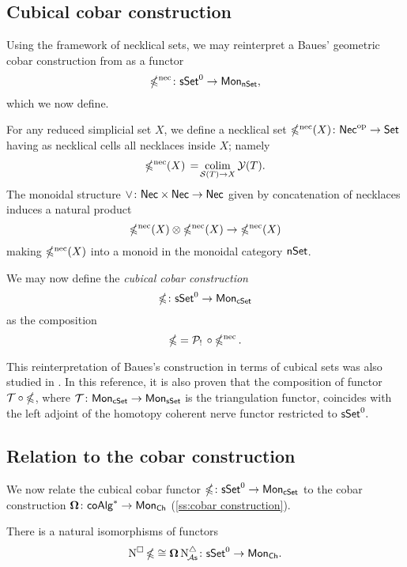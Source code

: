 \subsection{Cubical cobar construction}\label{ss:cubical cobar}

Using the framework of necklical sets, we may reinterpret a Baues' geometric cobar construction from \cite{baues1980geometry} as a functor
\[
\operatorname{\mathbb{\Omega}^{\mathrm{nec}}} \colon \mathsf{sSet}^0 \to \mathsf{Mon}_{\mathsf{nSet}},
\]
which we now define.

For any reduced simplicial set $X$, we define a necklical set $\operatorname{\mathbb{\Omega}^{\mathrm{nec}}}(X) \colon \mathsf{Nec}^{\mathrm{op}} \to \mathsf{Set}$ having as necklical cells all necklaces inside $X$; namely
\[
\operatorname{\mathbb{\Omega}^{\mathrm{nec}}}(X) \, = \! \operatorname*{colim}_{\mathcal{S}(T) \to X} \mathcal{Y}(T).
\]
The monoidal structure $\vee \colon \mathsf{Nec} \times \mathsf{Nec} \to \mathsf{Nec}$ given by concatenation of necklaces induces a natural product
\[
\operatorname{\mathbb{\Omega}^{\mathrm{nec}}}(X) \otimes \operatorname{\mathbb{\Omega}^{\mathrm{nec}}}(X) \to \operatorname{\mathbb{\Omega}^{\mathrm{nec}}}(X)
\]
making $\operatorname{\mathbb{\Omega}^{\mathrm{nec}}}(X)$ into a monoid in the monoidal category $\mathsf{nSet}$.

We may now define the \textit{cubical cobar construction}
\[
\operatorname{\mathbb{\Omega}} \colon \mathsf{sSet}^0 \to \mathsf{Mon}_{\mathsf{cSet}}
\]
as the composition
\[
\operatorname{\mathbb{\Omega}} = \mathcal{P}_! \, \circ \operatorname{\mathbb{\Omega}^{\mathrm{nec}}}.
\]
\begin{remark} This reinterpretation of Baues's construction in terms of cubical sets was also studied in \cite{rivera2018cubical}. In this reference, it is also proven that the composition of functor $\mathcal{T} \circ \operatorname{\mathbb{\Omega}}$, where $\mathcal{T} \colon \mathsf{Mon}_{\mathsf{cSet}} \to \mathsf{Mon}_{\mathsf{sSet}}$ is the triangulation functor, coincides with the left adjoint of the homotopy coherent nerve functor restricted to $\mathsf{sSet}^0.$
\end{remark}
\subsection{Relation to the cobar construction}

We now relate the cubical cobar functor $\operatorname{\mathbb{\Omega}} \colon \mathsf{sSet}^0 \to \mathsf{Mon}_{\mathsf{cSet}}$ to the cobar construction $\operatorname{\mathbf{\Omega}} \colon \mathsf{coAlg}^\ast \to \mathsf{Mon}_{\mathsf{Ch}}$ (\cref{ss:cobar construction}).

\begin{theorem}\label{t:ccobar and cobar}
	There is a natural isomorphisms of functors
	\[
	\operatorname{N^{\square}} \operatorname{\mathbb{\Omega}} \cong \operatorname{\mathbf{\Omega}} \operatorname{N^{\triangle}_{\!{\mathcal{A}\mathsf{s}}}} \colon \mathsf{sSet}^0 \to \mathsf{Mon}_{\mathsf{Ch}}.
	\]
\end{theorem}

